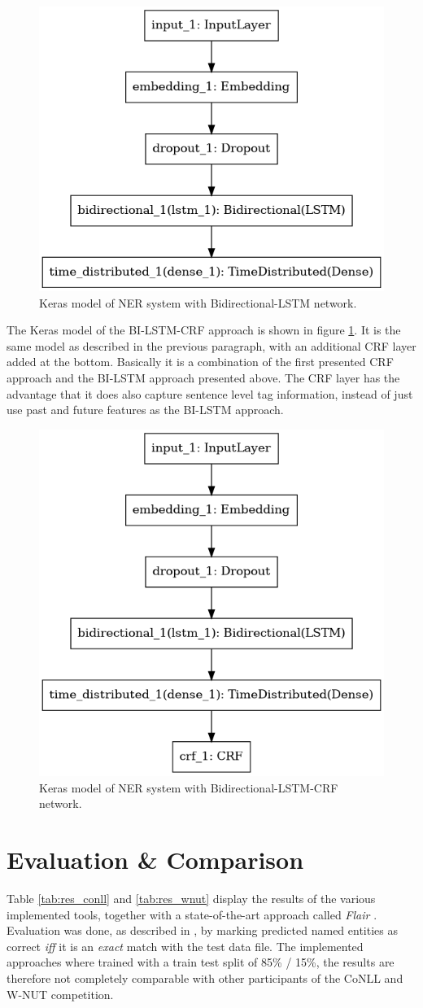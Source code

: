 \documentclass[12pt]{book}
\begin{document}
	\begin{figure}
		\begin{center}
			\includegraphics[width=0.4\linewidth]{img/lstm_model.png}
		\end{center}
		\caption{Keras model of NER system with Bidirectional-LSTM network.}
		\label{fig:lstm}
	\end{figure}

	The Keras model of the BI-LSTM-CRF approach is shown in figure \ref{fig:lstm}. It is the same model as described in the previous paragraph, with an additional CRF layer added at the bottom. Basically it is a combination of the first presented CRF approach and the BI-LSTM approach presented above. The CRF layer has the advantage that it does also capture sentence level tag information, instead of just use past and future features as the BI-LSTM approach.
	
	\begin{figure}
		\begin{center}
			\includegraphics[width=0.4\linewidth]{img/lstm_crf_model.png}
		\end{center}
		\caption{Keras model of NER system with Bidirectional-LSTM-CRF network.}
		\label{fig:lstm-crf}
	\end{figure}
	

	\chapter{Evaluation \& Comparison}
	\label{chap:evaluation}
	
	Table \ref{tab:res_conll} and \ref{tab:res_wnut} display the results of the various implemented tools, together with a state-of-the-art approach called \textit{Flair} \cite{akbik2019flair}. Evaluation was done, as described in \cite{tjongkimsang2003conll}, by marking predicted named entities as correct \textit{iff} it is an \textit{exact} match with the test data file. The implemented approaches where trained with a train test split of 85\% / 15\%, the results are therefore not completely comparable with other participants of the CoNLL and W-NUT competition.
	
\end{document}
